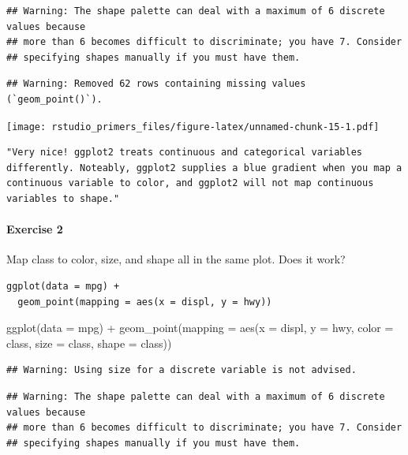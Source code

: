 \documentclass[
]{article}
\newenvironment{Shaded}{\begin{snugshade}}{\end{snugshade}}
\newcommand{\AttributeTok}[1]{\textcolor[rgb]{0.77,0.63,0.00}{#1}}
\newcommand{\FunctionTok}[1]{\textcolor[rgb]{0.00,0.00,0.00}{#1}}
\newcommand{\NormalTok}[1]{#1}
\newcommand{\SpecialCharTok}[1]{\textcolor[rgb]{0.00,0.00,0.00}{#1}}
\begin{document}
\begin{verbatim}
## Warning: The shape palette can deal with a maximum of 6 discrete values because
## more than 6 becomes difficult to discriminate; you have 7. Consider
## specifying shapes manually if you must have them.
\end{verbatim}

\begin{verbatim}
## Warning: Removed 62 rows containing missing values (`geom_point()`).
\end{verbatim}

\texttt{[image: rstudio\_primers\_files/figure-latex/unnamed-chunk-15-1.pdf]}

\begin{verbatim}
"Very nice! ggplot2 treats continuous and categorical variables differently. Noteably, ggplot2 supplies a blue gradient when you map a continuous variable to color, and ggplot2 will not map continuous variables to shape."
\end{verbatim}

\hypertarget{exercise-2-1}{%
\paragraph{Exercise 2}\label{exercise-2-1}}

Map class to color, size, and shape all in the same plot. Does it work?

\begin{verbatim}
ggplot(data = mpg) + 
  geom_point(mapping = aes(x = displ, y = hwy))
\end{verbatim}

\begin{Shaded}
\begin{Highlighting}[]
\FunctionTok{ggplot}\NormalTok{(}\AttributeTok{data =}\NormalTok{ mpg) }\SpecialCharTok{+} 
  \FunctionTok{geom\_point}\NormalTok{(}\AttributeTok{mapping =} \FunctionTok{aes}\NormalTok{(}\AttributeTok{x =}\NormalTok{ displ, }\AttributeTok{y =}\NormalTok{ hwy, }\AttributeTok{color =}\NormalTok{ class, }\AttributeTok{size =}\NormalTok{ class, }\AttributeTok{shape =}\NormalTok{ class))}
\end{Highlighting}
\end{Shaded}

\begin{verbatim}
## Warning: Using size for a discrete variable is not advised.
\end{verbatim}

\begin{verbatim}
## Warning: The shape palette can deal with a maximum of 6 discrete values because
## more than 6 becomes difficult to discriminate; you have 7. Consider
## specifying shapes manually if you must have them.
\end{verbatim}
\end{document}
